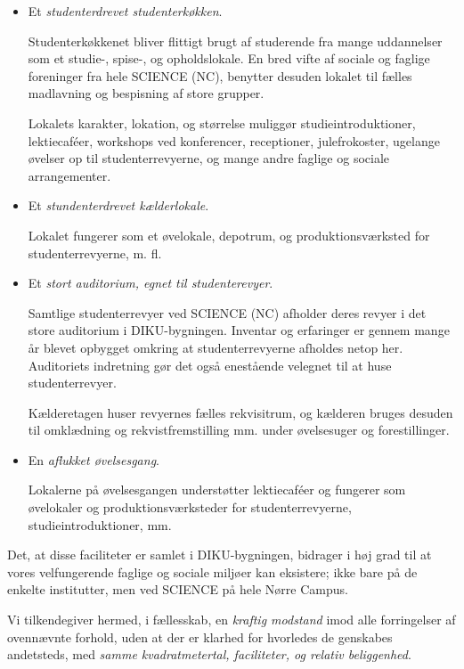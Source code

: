 \documentclass[a4paper]{article}
\begin{document}
\begin{itemize}

\item Et \emph{studenterdrevet studenterkøkken}.

  Studenterkøkkenet bliver flittigt brugt af studerende fra mange
  uddannelser som et studie-, spise-, og opholdslokale. En bred vifte
  af sociale og faglige foreninger fra hele SCIENCE (NC), benytter
  desuden lokalet til fælles madlavning og bespisning af store
  grupper.

  Lokalets karakter, lokation, og størrelse muliggør
  studieintroduktioner, lektiecaféer, workshops ved konferencer,
  receptioner, julefrokoster, ugelange øvelser op til
  studenterrevyerne, og mange andre faglige og sociale arrangementer.

\item Et \emph{stundenterdrevet kælderlokale}.

  Lokalet fungerer som et øvelokale, depotrum, og produktionsværksted
  for studenterrevyerne, m. fl.

\item Et \emph{stort auditorium, egnet til studenterevyer}.

  Samtlige studenterrevyer ved SCIENCE (NC) afholder deres revyer i
  det store auditorium i DIKU-bygningen. Inventar og erfaringer er
  gennem mange år blevet opbygget omkring at studenterrevyerne
  afholdes netop her. Auditoriets indretning gør det også enestående
  velegnet til at huse studenterrevyer.

  Kælderetagen huser revyernes fælles rekvisitrum, og kælderen bruges desuden
  til omklædning og rekvistfremstilling mm. under øvelsesuger og forestillinger.

\item En \emph{aflukket øvelsesgang}.

Lokalerne på øvelsesgangen understøtter lektiecaféer og fungerer som
øvelokaler og produktionsværksteder for studenterrevyerne,
studieintroduktioner, mm.

\end{itemize}

Det, at disse faciliteter er samlet i DIKU-bygningen, bidrager i høj
grad til at vores velfungerende faglige og sociale miljøer kan
eksistere; ikke bare på de enkelte institutter, men ved SCIENCE på
hele Nørre Campus.

Vi tilkendegiver hermed, i fællesskab, en \emph{kraftig modstand} imod
alle forringelser af ovennævnte forhold, uden at der er klarhed for
hvorledes de genskabes andetsteds, med \emph{samme kvadratmetertal,
  faciliteter, og relativ beliggenhed}.
\end{document}
